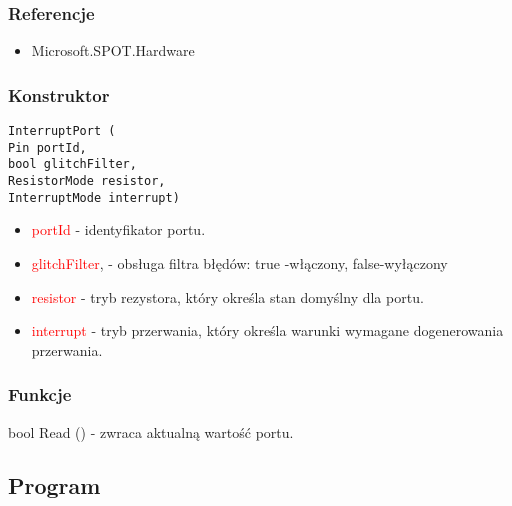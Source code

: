 \documentclass{article}
\begin{document}
\subsubsection{Referencje}
\begin{itemize}
\item Microsoft.SPOT.Hardware
\end{itemize}
\subsubsection{Konstruktor}
\begin{lstlisting}[frame=single] 
InterruptPort (
Pin portId, 
bool glitchFilter,
ResistorMode resistor,
InterruptMode interrupt)
\end{lstlisting}

\begin{itemize}
\item \textcolor{red}{portId} - identyfikator portu.
\item \textcolor{red}{glitchFilter}, - obsługa filtra błędów: true -włączony, false-wyłączony
\item \textcolor{red}{resistor} - tryb rezystora, który określa stan domyślny dla portu.
\item \textcolor{red}{interrupt} - tryb przerwania, który określa warunki wymagane do\newline generowania przerwania.
\end{itemize}
\subsubsection{Funkcje}
bool Read () - zwraca aktualną wartość portu.
\subsection{Program}
\end{document}

